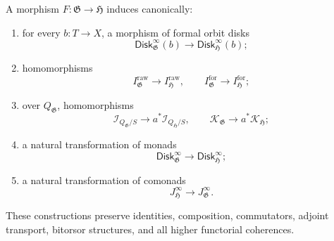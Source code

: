 \begin{proposition}
\label{prop:formal-gpd-functoriality-fixed-X}
A morphism
$F:\mathfrak G\to\mathfrak H$
induces canonically:
\begin{enumerate}
    \item for every $b:T\to X$, a morphism of formal orbit disks
    \[
        \mathsf{Disk}^{\infty}_{\mathfrak G}(b)
        \longrightarrow
        \mathsf{Disk}^{\infty}_{\mathfrak H}(b);
    \]
    \item homomorphisms
    \[
        I^{\mathrm{raw}}_{\mathfrak G}
        \longrightarrow
        I^{\mathrm{raw}}_{\mathfrak H},
        \qquad
        I^{\mathrm{for}}_{\mathfrak G}
        \longrightarrow
        I^{\mathrm{for}}_{\mathfrak H};
    \]
    \item over $Q_{\mathfrak G}$, homomorphisms
    \[
        \mathcal I_{Q_{\mathfrak G}/S}
        \longrightarrow
        a^*\mathcal I_{Q_{\mathfrak H}/S},
        \qquad
        \mathcal K_{\mathfrak G}
        \longrightarrow
        a^*\mathcal K_{\mathfrak H};
    \]
    \item a natural transformation of monads
    \[
        \mathsf{Disk}^{\infty}_{\mathfrak G}
        \longrightarrow
        \mathsf{Disk}^{\infty}_{\mathfrak H};
    \]
    \item a natural transformation of comonads
    \[
        J^\infty_{\mathfrak H}
        \longrightarrow
        J^\infty_{\mathfrak G}.
    \]
\end{enumerate}
These constructions preserve identities, composition, commutators,
adjoint transport, bitorsor structures, and all higher functorial
coherences.
\end{proposition}

